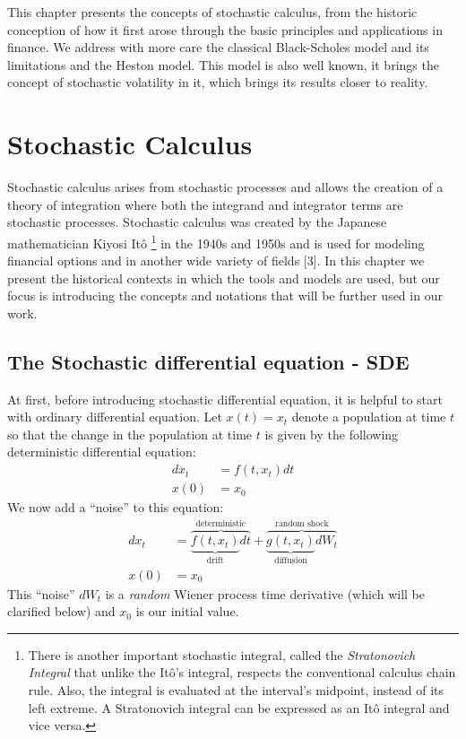 \documentclass[12pt,twoside]{reedthesis}
\theoremstyle{definition}
\theoremstyle{definition}
\theoremstyle{remark}
\begin{document}
  This chapter presents the concepts of stochastic calculus, from the
  historic conception of how it first arose through the basic principles
  and applications in finance. We address with more care the classical
  Black-Scholes model and its limitations and the Heston model. This model
  is also well known, it brings the concept of stochastic volatility in
  it, which brings its results closer to reality.
  
  \section{Stochastic Calculus}\label{stochastic-calculus}
  
  Stochastic calculus arises from stochastic processes and allows the
  creation of a theory of integration where both the integrand and
  integrator terms are stochastic processes. Stochastic calculus was
  created by the Japanese mathematician Kiyosi Itô
  \footnote{There is another important stochastic integral, called the \textit{Stratonovich Integral} that unlike the Itô's integral, respects the conventional calculus chain rule. Also, the integral is evaluated at the interval's midpoint, instead of its left extreme. A Stratonovich integral can be expressed as an Itô integral and vice versa.}
  in the 1940s and 1950s and is used for modeling financial options and in
  another wide variety of fields {[}3{]}. In this chapter we present the
  historical contexts in which the tools and models are used, but our
  focus is introducing the concepts and notations that will be further
  used in our work.
  
  \subsection{The Stochastic differential equation -
  SDE}\label{the-stochastic-differential-equation---sde}
  
  At first, before introducing stochastic differential equation, it is
  helpful to start with ordinary differential equation. Let \(x(t) = x_t\)
  denote a population at time \(t\) so that the change in the population
  at time \(t\) is given by the following deterministic differential
  equation:
  \begin{align}
  dx_t &= f(t, x_t)dt \\
  x(0) &= x_0 \nonumber
  \end{align}
  We now add a ``noise'' to this equation:
  \begin{align} \label{eq:sde1}
  dx_t &= \overbrace{\underbrace{f(t, x_t)}_\text{drift}dt}^\text{deterministic} + \overbrace{\underbrace{g(t, x_t)}_\text{diffusion}dW_t}^\text{random shock} \\
  x(0) &= x_0 \nonumber
  \end{align}
  This ``noise'' \(dW_t\) is a \emph{random} Wiener process time
  derivative (which will be clarified below) and \(x_0\) is our initial
  value.
  
\end{document}
